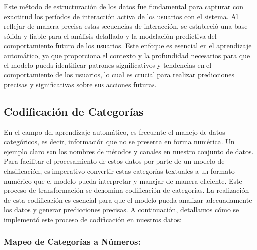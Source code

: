 Este método de estructuración de los datos fue fundamental para capturar con exactitud los períodos de interacción activa de los usuarios con el sistema. Al reflejar de manera precisa estas secuencias de interacción, se estableció una base sólida y fiable para el análisis detallado y la modelación predictiva del comportamiento futuro de los usuarios. Este enfoque es esencial en el aprendizaje automático, ya que proporciona el contexto y la profundidad necesarios para que el modelo pueda identificar patrones significativos y tendencias en el comportamiento de los usuarios, lo cual es crucial para realizar predicciones precisas y significativas sobre sus acciones futuras.

\subsection{Codificación de Categorías}

En el campo del aprendizaje automático, es frecuente el manejo de datos categóricos, es decir, información que no se presenta en forma numérica. Un ejemplo claro son los nombres de métodos y canales en nuestro conjunto de datos. Para facilitar el procesamiento de estos datos por parte de un modelo de clasificación, es imperativo convertir estas categorías textuales a un formato numérico que el modelo pueda interpretar y manejar de manera eficiente. Este proceso de transformación se denomina codificación de categorías. La realización de esta codificación es esencial para que el modelo pueda analizar adecuadamente los datos y generar predicciones precisas. A continuación, detallamos cómo se implementó este proceso de codificación en nuestros datos:

\subsubsection{Mapeo de Categorías a Números:}

